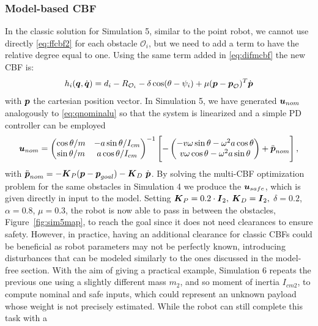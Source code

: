 \subsubsection{Model-based CBF}
In the classic solution for Simulation 5, similar to the point robot, we cannot use directly \eqref{eq:ffcbf2} for each obstacle $\mathcal{O}_i$, but we need to add a term to have the relative degree equal to one. Using the same term added in \eqref{eq:difmcbf} the new CBF is:
\begin{equation}
   h_i({\boldsymbol{q}},\dot{\boldsymbol{q}}) = d_i-R_{\mathcal{O}_i}-\delta \cos(\theta - \psi_i)+\mu(\boldsymbol{p}-\boldsymbol{p}_\mathcal{O})^T\dot{\boldsymbol{p}}
   \label{eq:ffcbf2}
\end{equation}
with $\boldsymbol{p}$ the cartesian position vector. In Simulation 5, we have generated $\boldsymbol{u}_{nom}$ analogously to \eqref{eq:qnominalu} so that the system is linearized and a simple PD controller can be employed
    \begin{equation}
          \boldsymbol{u}_{nom}= \begin{pmatrix}
      \cos\theta/m & -a\sin\theta/I_{cm} \\
       \sin\theta/m & a\cos\theta/I_{cm}
    \end{pmatrix}^{-1} 
     \begin{bmatrix}
     - \begin{pmatrix}
     -v\omega\sin\theta-\omega^2a\cos\theta \\
        v\omega\cos\theta-\omega^2a\sin\theta
         \end{pmatrix}
           + \ddot{\boldsymbol{p}}_{nom}
         \end{bmatrix},
    \end{equation}
with  $\ddot{\boldsymbol{p}}_{nom} = -\boldsymbol{K}_P(\boldsymbol{p}-\boldsymbol{p}_{goal})-\boldsymbol{K}_D~\dot{\boldsymbol{p}}$. By solving the multi-CBF optimization problem for the same obstacles in Simulation 4 we produce the $\boldsymbol{u}_{safe}$, which is given directly in input to the model. 
Setting $\boldsymbol{K}_P = 0.2\cdot\boldsymbol{I}_2,$ $\boldsymbol{K}_D = \boldsymbol{I}_2,$ $\delta = 0.2$, $\alpha = 0.8$, $\mu = 0.3$, the robot is now able to pass in between the obstacles, Figure~\ref{fig:sim5map}, to reach the goal since it does not need clearances to ensure safety. 
However, in practice, having an additional clearance for classic CBFs could be beneficial as robot parameters may not be perfectly known, introducing disturbances that can be modeled similarly to the ones discussed in the model-free section. With the aim of giving a practical example, Simulation 6 repeats the previous one using a slightly different mass $m_2$, and so moment of inertia $I_{cm2}$, to compute nominal and safe inputs, which could represent an unknown payload whose weight is not precisely estimated. While the robot can still complete this task with a
